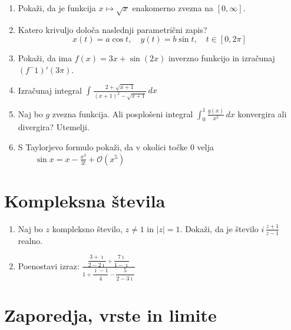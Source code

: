 \documentclass[a4paper,12pt]{article}
\begin{document}
\begin{enumerate}
\item
Pokaži, da je funkcija $x \mapsto \sqrt{x}$ enakomerno zvezna na $\left[0,\infty\right] $.

\item
Katero krivuljo določa naslednji parametrični zapis?
\[
x(t) = a \cos t,\quad %
y(t) = b \sin t,\quad %
t \in [0, 2 \pi]
\]

\item
Pokaži, da ima $f(x)=3x + \sin(2x)$ inverzno funkcijo in izračunaj $(f^-1)'(3\pi)$.

\item
Izračunaj integral
$\displaystyle \int_{}^{} \frac{2+\sqrt{x+1}}{(x+1)^2-\sqrt{x+1}} \,dx $

\item
Naj bo \(g\) zvezna funkcija. Ali posplošeni integral
$\int_{0}^{1} \frac{g(x)}{x^2} \,dx $
konvergira ali divergira? Utemelji.

\item
S Taylorjevo formulo pokaži, da v okolici točke \(0\) velja \\
$\qquad \sin x = x- \frac{x^3}{3!} + \mathcal{O} (x^5)$
\end{enumerate}

\section*{Kompleksna števila}

\begin{enumerate}
\item
Naj bo \(z\) kompleksno število, \(z \ne 1\) in $|z|=1 $.
Dokaži, da je število $ i \, \frac{z+1}{z-1} $ realno.

\item
Poenostavi izraz:
$\displaystyle \frac{\dfrac{3+\imath}{2-2\imath}+ \dfrac{7\imath}{1-\imath}}{1+ \dfrac{\imath-1}{4}-\dfrac{5}{2-3\imath}}$
\end{enumerate}

\section*{Zaporedja, vrste in limite}
\end{document}

